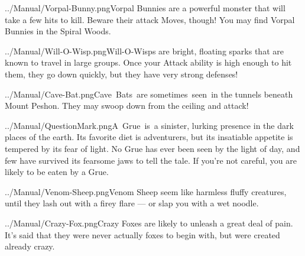 \documentclass[9pt,twocolumn,openany,article,crop]{memoir}
\newcommand\englishskip{\vspace{14pt}}
\begin{document}
{\englishskip

\lettrine[image=true,                lines=4,               findent=3pt,
nindent=3pt]{../Manual/Vorpal-Bunny.png}\nobreak\hspace{.2em plus 0}Vorpal  Bunnies are
a  powerful monster  that will  take a  few hits  to kill.  Beware their
attack Moves, though! You may find Vorpal Bunnies in the Spiral Woods.

\englishskip

\lettrine[image=true,                lines=4,               findent=3pt,
nindent=3pt]{../Manual/Will-O-Wisp.png}\nobreak\hspace{.2em plus 0}Will-O-Wisps     are
bright,  floating sparks  that  are  known to  travel  in large  groups.
Once  your Attack  ability is  high  enough to  hit them,  they go  down
quickly, but they have very strong defenses!

\englishskip

\lettrine[image=true,                lines=4,               findent=3pt,
nindent=3pt]{../Manual/Cave-Bat.png}\nobreak\hspace{.2em plus 0}Cave~Bats~are sometimes~seen~in the
tunnels  beneath Mount  Peshon. They  may  swoop down  from the  ceiling
and attack!

\englishskip

\lettrine[image=true,                lines=4,               findent=3pt,
nindent=3pt]{../Manual/QuestionMark.png}\nobreak\hspace{.2em plus 0}A~Grue~is~a
sinister, lurking presence in the dark places of the earth. Its favorite
diet is adventurers, but its insatiable appetite is tempered by its fear
of light. No Grue  has ever been seen by the light of  day, and few have
survived its fearsome jaws to tell  the tale. If you're not careful, you
are likely to be eaten by a Grue.

\englishskip

\lettrine[image=true,                lines=4,               findent=3pt,
nindent=3pt]{../Manual/Venom-Sheep.png}\nobreak\hspace{.2em plus 0}Venom   Sheep   seem
like  harmless  fluffy creatures,  until  they  lash  out with  a  firey
flare --- or slap you with a wet noodle.

\ifdefined\ATARIAGESAVE\pagebreak\else\englishskip\fi

\lettrine[image=true,                lines=4,               findent=3pt,
nindent=3pt]{../Manual/Crazy-Fox.png}\nobreak\hspace{.2em plus 0}Crazy Foxes are likely
to unleash a great deal of pain. It's said that they were never actually
foxes to begin with, but were created already crazy.

}
\end{document}
